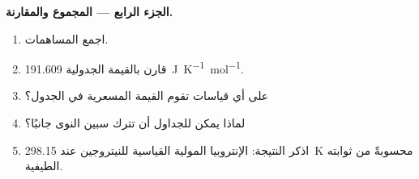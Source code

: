 \begin{problem}
\medskip\noindent\textbf{الجزء الرابع --- المجموع والمقارنة.}
\begin{enumerate}[resume]
  \item اجمع المساهمات.
  \item قارن بالقيمة الجدولية \qty{191.609}{J.K^{-1}.mol^{-1}}.
  \item على أي قياسات تقوم القيمة المسعرية في الجدول؟
  \item لماذا يمكن للجداول أن تترك سبين النوى جانبًا؟
  \item اذكر النتيجة: الإنتروبيا المولية القياسية للنيتروجين عند \qty{298.15}{K}
        محسوبةً من ثوابته الطيفية.
\end{enumerate}
\end{problem}
